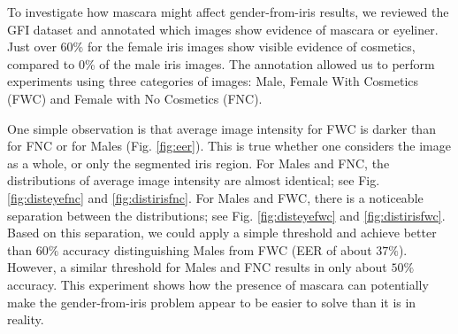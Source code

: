 \documentclass[10pt,twocolumn,letterpaper]{article}
\begin{document}
To investigate how mascara might affect gender-from-iris results, we reviewed the GFI dataset and annotated which images show evidence of mascara or eyeliner.
Just over $60\%$ for the female iris images show visible evidence of cosmetics, compared to 0\% of the male iris images.
The annotation allowed us to perform experiments using three categories of images: Male, Female With Cosmetics (FWC) and Female with No Cosmetics (FNC). 

One simple observation is that average image intensity for FWC is darker than for FNC or for Males (Fig. \ref{fig:eer}).
This is true whether one considers the image as a whole, or only the segmented iris region.
For Males and FNC, the distributions of average image intensity are almost identical; see Fig. \ref{fig:disteyefnc} and \ref{fig:distirisfnc}. 
For Males and FWC, there is a noticeable separation between the distributions; see Fig. \ref{fig:disteyefwc} and \ref{fig:distirisfwc}.
Based on this separation, we could apply a simple threshold and achieve better than $60\%$ accuracy distinguishing Males from FWC (EER of about $37\%$).
However, a similar threshold for Males and FNC results in only about $50\%$ accuracy.
This experiment shows how the presence of mascara can potentially make the gender-from-iris problem appear to be easier to solve than it is in reality.
\end{document}
